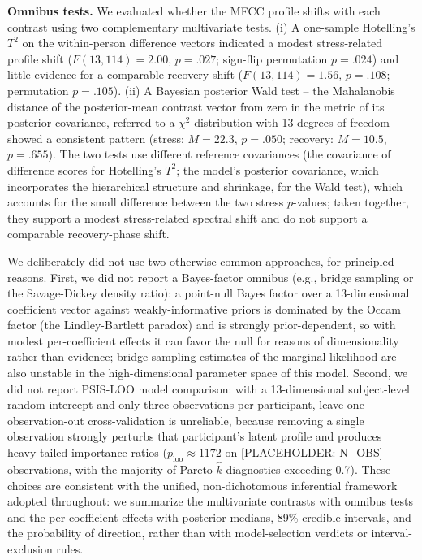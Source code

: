\documentclass[
  english,
  man,floatsintext]{apa6}
\begin{document}
\textbf{Omnibus tests.} We evaluated whether the MFCC profile shifts with each contrast using two complementary multivariate tests. (i) A one-sample Hotelling's \(T^2\) on the within-person difference vectors indicated a modest stress-related profile shift (\(F(13, 114) = 2.00\), \(p = .027\); sign-flip permutation \(p = .024\)) and little evidence for a comparable recovery shift (\(F(13, 114) = 1.56\), \(p = .108\); permutation \(p = .105\)). (ii) A Bayesian posterior Wald test -- the Mahalanobis distance of the posterior-mean contrast vector from zero in the metric of its posterior covariance, referred to a \(\chi^2\) distribution with 13 degrees of freedom -- showed a consistent pattern (stress: \(M = 22.3\), \(p = .050\); recovery: \(M = 10.5\), \(p = .655\)). The two tests use different reference covariances (the covariance of difference scores for Hotelling's \(T^2\); the model's posterior covariance, which incorporates the hierarchical structure and shrinkage, for the Wald test), which accounts for the small difference between the two stress \(p\)-values; taken together, they support a modest stress-related spectral shift and do not support a comparable recovery-phase shift.

We deliberately did not use two otherwise-common approaches, for principled reasons. First, we did not report a Bayes-factor omnibus (e.g., bridge sampling or the Savage-Dickey density ratio): a point-null Bayes factor over a 13-dimensional coefficient vector against weakly-informative priors is dominated by the Occam factor (the Lindley-Bartlett paradox) and is strongly prior-dependent, so with modest per-coefficient effects it can favor the null for reasons of dimensionality rather than evidence; bridge-sampling estimates of the marginal likelihood are also unstable in the high-dimensional parameter space of this model. Second, we did not report PSIS-LOO model comparison: with a 13-dimensional subject-level random intercept and only three observations per participant, leave-one-observation-out cross-validation is unreliable, because removing a single observation strongly perturbs that participant's latent profile and produces heavy-tailed importance ratios (\(p_{\text{loo}} \approx 1172\) on {[}PLACEHOLDER: N\_OBS{]} observations, with the majority of Pareto-\(\hat{k}\) diagnostics exceeding 0.7). These choices are consistent with the unified, non-dichotomous inferential framework adopted throughout: we summarize the multivariate contrasts with omnibus tests and the per-coefficient effects with posterior medians, 89\% credible intervals, and the probability of direction, rather than with model-selection verdicts or interval-exclusion rules.
\end{document}
